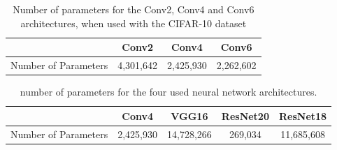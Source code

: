 \begin{table}[ht!]
  \centering\begin{tabular}{lccc}
    \cmidrule[\heavyrulewidth]{2-4}
                         & \textbf{Conv2} & \textbf{Conv4} & \textbf{Conv6} \\ \toprule
    Number of Parameters & 4,301,642      & 2,425,930      & 2,262,602      \\ \bottomrule
  \end{tabular}
  \caption{Number of parameters for the Conv2, Conv4 and Conv6 architectures, when used with the CIFAR-10 dataset}
  \label{tab:chap2:conv_num_params}
\end{table}

\begin{table}[ht!]
  \centering
  \begin{tabular}{lcccc}
    \cline{2-5}
                         & \textbf{Conv4} & \textbf{VGG16} & \textbf{ResNet20} & \textbf{ResNet18} \\ \hline
    Number of Parameters & 2,425,930      & 14,728,266     & 269,034           & 11,685,608        \\ \hline
  \end{tabular}
  \caption{ number of parameters for the four used neural network architectures.}
  \label{tab:intro:networks_size}
\end{table}